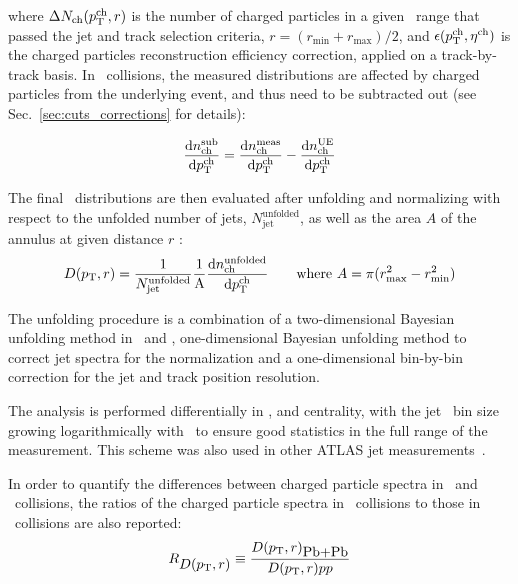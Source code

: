 where $\Delta N_{\text{ch}} (\mbox{$p_{{\mathrm{T}}}^{\mathrm{ch}}$}, r)$ is the number of charged particles in a given \pTch\ range that passed the jet and track selection criteria, $r = (r_{\text{min}} + r_{\text{max}}) / 2$, and $\epsilon(\mbox{$p_{\mathrm{T}}^{\mathrm{ch}}$}, \mbox{$\eta^{\mathrm{ch}}$})$ is the charged particles reconstruction efficiency correction, applied on a track-by-track basis. In \pbpb\ collisions, the measured distributions are affected by charged particles from the underlying event, and thus need to be subtracted out (see Sec.~\ref{sec:cuts_corrections} for details):

\begin{equation}
\frac{\text{d}n^{\text{sub}}_{\text{ch}}}{\text{d}\mbox{$p_{{\mathrm{T}}}^{\mathrm{ch}}$}} = \frac{\text{d}n^{\text{meas}}_{\text{ch}}}{\text{d}\mbox{$p_{{\mathrm{T}}}^{\mathrm{ch}}$}} - \frac{\text{d}n^{\text{UE}}_{\text{ch}}}{\text{d}\mbox{$p_{{\mathrm{T}}}^{\mathrm{ch}}$}}
\end{equation}

The final \Dptr\ distributions are then evaluated after unfolding and normalizing with respect to the unfolded number of jets, $N_{\text{jet}}^{\text{unfolded}}$, as well as the area $A$ of the annulus at given distance $r$ :
\begin{equation}
\mbox{$D( \mbox{$p_{\mathrm{T}}$}, r)$} = \frac{1}{N_{\text{jet}}^{\text{unfolded}}} \frac{1}{\text{A}} \frac{\text{d}n^{\text{unfolded}}_{\text{ch}}}{\text{d}\mbox{$p_{{\mathrm{T}}}^{\mathrm{ch}}$}} \quad \quad \text{where } A = \pi (r_{\text{max}}^2 - r_{\text{min}}^2)
\end{equation}

The unfolding procedure is a combination of a two-dimensional Bayesian unfolding method in \ptjet\ and \pttrk, one-dimensional Bayesian unfolding method to correct jet spectra for the normalization and a one-dimensional bin-by-bin correction for the jet and track position resolution. 

The analysis is performed differentially in \ptjet, and centrality, with the jet \pt\ bin size growing logarithmically with \ptjet\ to ensure good statistics in the full range of the measurement. This scheme was also used in other ATLAS jet measurements~\cite{ATLAS276FFConf}. 

In order to quantify the differences between charged particle spectra in \pbpb\ and \pp\  collisions, the ratios of the charged particle spectra in \pbpb\ collisions to those in \pp\ collisions are also reported:
\begin{equation}
   R_{\mbox{$D( \mbox{$p_{\mathrm{T}}$}, r)$}} \equiv \frac{\mbox{$D( \mbox{$p_{\mathrm{T}}$}, r)$}_{\mbox{Pb+Pb}}}{\mbox{$D( \mbox{$p_{\mathrm{T}}$}, r)$}{\mbox{$pp$}}}
\end{equation}


